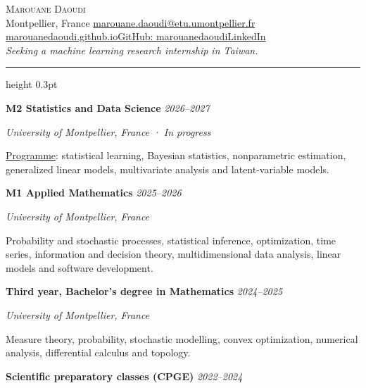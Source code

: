 \documentclass[a4paper,11pt]{article}
\newcommand{\cvsection}[1]{\par\vspace{7pt}{\fontsize{12}{14}\selectfont\scshape #1}\par\vspace{2pt}\hrule height 0.3pt\vspace{4pt}}
\newcommand{\cventry}[3]{\par\vspace{3pt}\textbf{#1} #3\hfill{\fontsize{9.8}{11.5}\selectfont\textit{#2}}\par}
\newenvironment{cvitems}{\begin{list}{\textbullet}{\setlength{\leftmargin}{1.1em}\setlength{\labelsep}{0.35em}\setlength{\itemsep}{1pt}\setlength{\topsep}{1pt}\setlength{\parsep}{0pt}\setlength{\partopsep}{0pt}}}{\end{list}}
\begin{document}
\fontsize{11}{13}\selectfont
\raggedright
\begin{center}
{\fontsize{22}{25}\selectfont\scshape Marouane Daoudi}\\[4pt]
{\fontsize{9.7}{12}\selectfont Montpellier, France \enspace\textperiodcentered\enspace \href{mailto:marouane.daoudi@etu.umontpellier.fr}{marouane.daoudi@etu.umontpellier.fr}}\\[2pt]
{\fontsize{9.7}{12}\selectfont \href{https://marouanedaoudi.github.io/}{marouanedaoudi.github.io}\enspace\textperiodcentered\enspace\href{https://github.com/marouanedaoudi}{GitHub: marouanedaoudi}\enspace\textperiodcentered\enspace\href{https://fr.linkedin.com/in/daoudimarouane}{LinkedIn}}\\[5pt]
{\fontsize{10}{12}\selectfont\textit{Seeking a machine learning research internship in Taiwan.}}
\end{center}
\vspace{-5pt}
\cvsection{Education}
\cventry{M2 Statistics and Data Science}{2026--2027}{}
\textit{University of Montpellier, France · In progress}\\[1pt]
\begin{cvitems}
\item \href{https://formations.umontpellier.fr/fr/formations/master-XB/master-mathematiques-ME157/statistique-et-science-des-donnees-ssd-KKIDCY8N/m2-statistique-et-science-des-donnees-ssd-biostats-KKIDDT0T.html}{Programme}: statistical learning, Bayesian statistics, nonparametric estimation, generalized linear models, multivariate analysis and latent-variable models.
\end{cvitems}
\cventry{M1 Applied Mathematics}{2025--2026}{}
\textit{University of Montpellier, France}\\[1pt]
\begin{cvitems}
\item Probability and stochastic processes, statistical inference, optimization, time series, information and decision theory, multidimensional data analysis, linear models and software development.
\end{cvitems}
\cventry{Third year, Bachelor's degree in Mathematics}{2024--2025}{}
\textit{University of Montpellier, France}\\[1pt]
\begin{cvitems}
\item Measure theory, probability, stochastic modelling, convex optimization, numerical analysis, differential calculus and topology.
\end{cvitems}
\cventry{Scientific preparatory classes (CPGE)}{2022--2024}{}
\end{document}
